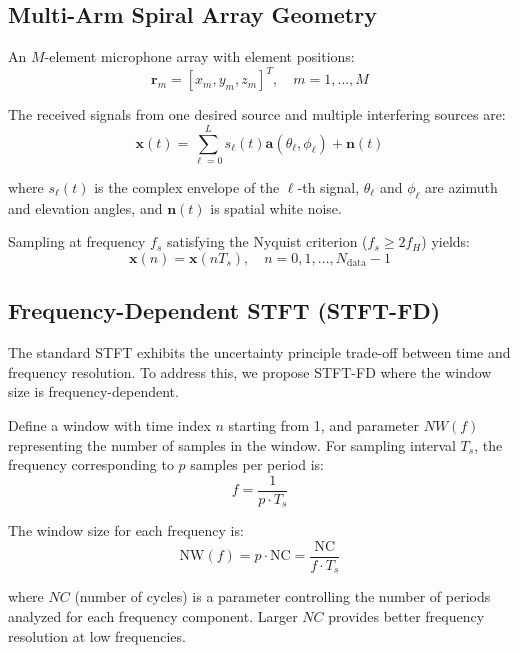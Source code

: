 \documentclass[journal]{IEEEtran}
\begin{document}
\subsection{Multi-Arm Spiral Array Geometry}

An $M$-element microphone array with element positions:
\begin{equation}
\boldsymbol{r}_m = \left[x_m, y_m, z_m\right]^T, \quad m = 1, \ldots, M
\end{equation}

The received signals from one desired source and multiple interfering sources are:
\begin{equation}
\boldsymbol{x}(t) = \sum_{\ell=0}^{L} s_\ell(t) \boldsymbol{a}(\theta_\ell, \phi_\ell) + \boldsymbol{n}(t)
\end{equation}

where $s_\ell(t)$ is the complex envelope of the $\ell$-th signal, $\theta_\ell$ and $\phi_\ell$ are azimuth and elevation angles, and $\boldsymbol{n}(t)$ is spatial white noise.

Sampling at frequency $f_s$ satisfying the Nyquist criterion ($f_s \geq 2f_H$) yields:
\begin{equation}
\boldsymbol{x}(n) = \boldsymbol{x}(nT_s), \quad n = 0, 1, \ldots, N_{\text{data}} - 1
\end{equation}

\subsection{Frequency-Dependent STFT (STFT-FD)}
The standard STFT exhibits the uncertainty principle trade-off between time and frequency resolution. To address this, we propose STFT-FD where the window size is frequency-dependent.

Define a window with time index $n$ starting from 1, and parameter $NW(f)$ representing the number of samples in the window. For sampling interval $T_s$, the frequency corresponding to $p$ samples per period is:
\begin{equation}
f = \frac{1}{p \cdot T_s}
\end{equation}

The window size for each frequency is:
\begin{equation}
\text{NW}(f) = p \cdot \text{NC} = \frac{\text{NC}}{f \cdot T_s}
\end{equation}

where $NC$ (number of cycles) is a parameter controlling the number of periods analyzed for each frequency component. Larger $NC$ provides better frequency resolution at low frequencies.
\end{document}

